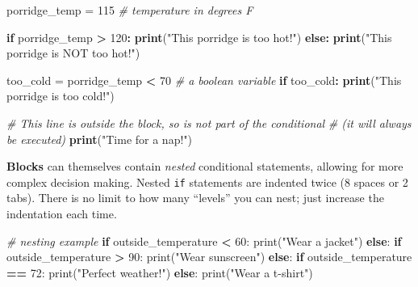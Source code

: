 \documentclass[]{book}
\newenvironment{Shaded}{\begin{snugshade}}{\end{snugshade}}
\newcommand{\KeywordTok}[1]{\textcolor[rgb]{0.13,0.29,0.53}{\textbf{#1}}}
\newcommand{\DecValTok}[1]{\textcolor[rgb]{0.00,0.00,0.81}{#1}}
\newcommand{\StringTok}[1]{\textcolor[rgb]{0.31,0.60,0.02}{#1}}
\newcommand{\CommentTok}[1]{\textcolor[rgb]{0.56,0.35,0.01}{\textit{#1}}}
\newcommand{\ControlFlowTok}[1]{\textcolor[rgb]{0.13,0.29,0.53}{\textbf{#1}}}
\newcommand{\OperatorTok}[1]{\textcolor[rgb]{0.81,0.36,0.00}{\textbf{#1}}}
\newcommand{\BuiltInTok}[1]{#1}
\newcommand{\NormalTok}[1]{#1}
\begin{document}
\begin{Shaded}
\begin{Highlighting}[]
\NormalTok{porridge_temp =}\StringTok{ }\DecValTok{115}  \CommentTok{# temperature in degrees F}

\ControlFlowTok{if}\NormalTok{ porridge_temp }\OperatorTok{>}\StringTok{ }\DecValTok{120}\OperatorTok{:}
\StringTok{    }\KeywordTok{print}\NormalTok{(}\StringTok{"This porridge is too hot!"}\NormalTok{)}
\ControlFlowTok{else}\OperatorTok{:}
\StringTok{    }\KeywordTok{print}\NormalTok{(}\StringTok{"This porridge is NOT too hot!"}\NormalTok{)}

\NormalTok{too_cold =}\StringTok{ }\NormalTok{porridge_temp }\OperatorTok{<}\StringTok{ }\DecValTok{70}  \CommentTok{# a boolean variable}
\ControlFlowTok{if}\NormalTok{ too_cold}\OperatorTok{:}
\StringTok{  }\KeywordTok{print}\NormalTok{(}\StringTok{"This porridge is too cold!"}\NormalTok{)}

\CommentTok{# This line is outside the block, so is not part of the conditional}
\CommentTok{# (it will always be executed)}
\KeywordTok{print}\NormalTok{(}\StringTok{"Time for a nap!"}\NormalTok{)}
\end{Highlighting}
\end{Shaded}

\textbf{Blocks} can themselves contain \emph{nested} conditional
statements, allowing for more complex decision making. Nested
\texttt{if} statements are indented twice (8 spaces or 2 tabs). There is
no limit to how many ``levels'' you can nest; just increase the
indentation each time.

\begin{Shaded}
\begin{Highlighting}[]
\CommentTok{# nesting example}
\ControlFlowTok{if}\NormalTok{ outside_temperature }\OperatorTok{<} \DecValTok{60}\NormalTok{:}
    \BuiltInTok{print}\NormalTok{(}\StringTok{"Wear a jacket"}\NormalTok{)}
\ControlFlowTok{else}\NormalTok{:}
    \ControlFlowTok{if}\NormalTok{ outside_temperature }\OperatorTok{>} \DecValTok{90}\NormalTok{:}
        \BuiltInTok{print}\NormalTok{(}\StringTok{"Wear sunscreen"}\NormalTok{)}
    \ControlFlowTok{else}\NormalTok{:}
        \ControlFlowTok{if}\NormalTok{ outside_temperature }\OperatorTok{==} \DecValTok{72}\NormalTok{:}
            \BuiltInTok{print}\NormalTok{(}\StringTok{"Perfect weather!"}\NormalTok{)}
        \ControlFlowTok{else}\NormalTok{:}
            \BuiltInTok{print}\NormalTok{(}\StringTok{"Wear a t-shirt"}\NormalTok{)}
\end{Highlighting}
\end{Shaded}
\end{document}
